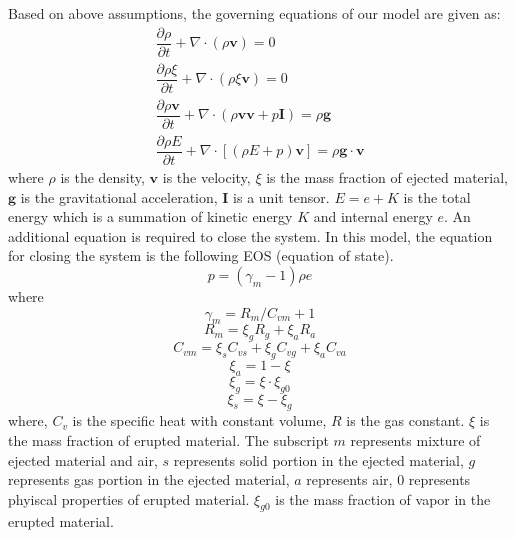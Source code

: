 \documentclass[utf8]{frontiersSCNS} %
\begin{document}
Based on above assumptions, the governing equations of our model are given as:
\begin{align}
\dfrac{\partial \rho}{\partial t} + \nabla \cdot \left(\rho \textbf{v}\right) = 0 \label{eq:gov-cs-rho} \\
\dfrac{\partial \rho \xi}{\partial t} + \nabla \cdot \left(\rho \xi \textbf{v}\right) = 0 \label{eq:gov-cs-ks}\\
\dfrac{\partial \rho \textbf{v}}{\partial t} + \nabla \cdot \left(\rho \textbf{v} \textbf{v} + p\textbf{I}\right) = \rho \textbf{g} \label{eq:gov-cs-v} \\
\dfrac{\partial \rho E}{\partial t} + \nabla \cdot \left[\left(\rho E + p \right)\textbf{v}\right] = \rho \textbf{g} \cdot\textbf{v} \label{eq:gov-cs-e}
\end{align}
where $\rho$ is the density, $\textbf{v}$ is the velocity, $\xi$ is the mass fraction of ejected material, $\textbf{g}$ is the gravitational acceleration, $\textbf{I}$ is a unit tensor.
$E = e + K $ is the total energy which is a summation of kinetic energy $K$ and internal energy $e$.
An additional equation is required to close the system. In this model, the equation for closing the system is the following EOS (equation of state).
\begin{equation}
p = \left(\gamma_m - 1\right)\rho e \label{eq:EOS}
\end{equation}
where
\begin{equation}
\gamma_m = R_m/C_{vm} + 1 \label{eq:gov-gm}
\end{equation}
\begin{equation}
R_m = \xi_g R_g + \xi_a R_a  \label{eq:gov-Rm}
\end{equation}
\begin{equation}
C_{vm} = \xi_s C_{vs} + \xi_g C_{vg} + \xi_a C_{va} \label{eq:gov-Cvm}
\end{equation}
\begin{equation}
\xi_a = 1 - \xi \label{eq:gov-na}
\end{equation}
\begin{equation}
\xi_g = \xi \cdot \xi_{g0} \label{eq:gov-ng}
\end{equation}
\begin{equation}
\xi_s = \xi - \xi_g \label{eq:gov-ns}
\end{equation}
where, $C_v$ is the specific heat with constant volume, $R$ is the gas constant. $\xi$ is the mass fraction of erupted material. The subscript $m$ represents mixture of ejected material and air, $s$ represents solid portion in the ejected material, $g$ represents gas portion in the ejected material, $a$ represents air, $0$ represents phyiscal properties of erupted material. $\xi_{g0}$ is the mass fraction of vapor in the erupted material.
\end{document}
